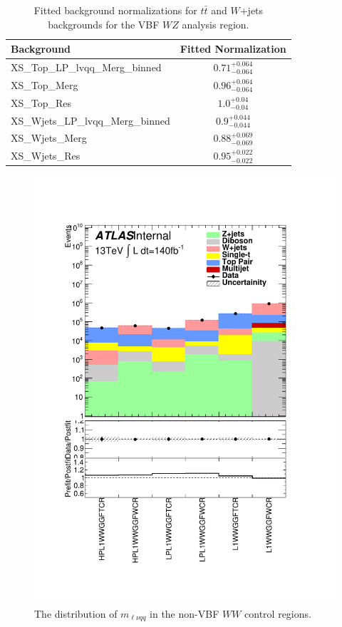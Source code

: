 \begin{table}
\begin{tabular}{|l|c|}
\hline
Background & Fitted Normalization \\\hline
XS\_Top\_LP\_lvqq\_Merg\_binned & $0.71^{+0.064}_{-0.064}$ \\\hline
XS\_Top\_Merg & $0.96^{+0.064}_{-0.064}$ \\\hline
XS\_Top\_Res & $1.0^{+0.04}_{-0.04}$ \\\hline
XS\_Wjets\_LP\_lvqq\_Merg\_binned & $0.9^{+0.044}_{-0.044}$ \\\hline
XS\_Wjets\_Merg & $0.88^{+0.069}_{-0.069}$ \\\hline
XS\_Wjets\_Res & $0.95^{+0.022}_{-0.022}$ \\\hline
\end{tabular}
\caption{Fitted background normalizations for $t\bar{t}$ and $W$+jets backgrounds for the VBF $WZ$ analysis region.}
\label{tbl:hvtwzvbf_norm}
\end{table}


\begin{figure}[h!]
  \centering
  \includegraphics[width=\hsize]{figures/results/HVTWW/PlotyieldTable_postfit.pdf}
 \caption{The distribution of $m_{\ell\nu qq}$ in the non-VBF $WW$ control regions.} 
  \label{fig:hvtww_cr_postfit}
\end{figure} 
\FloatBarrier

